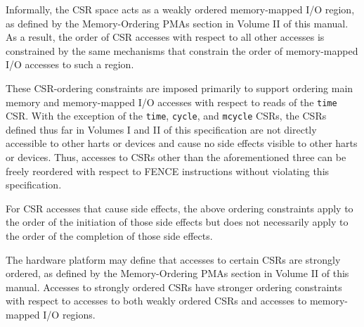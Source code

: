 \begin{commentary}
Informally, the CSR space acts as a weakly ordered memory-mapped I/O region, as
defined by the Memory-Ordering PMAs section in Volume II of this manual. As a
result, the order of CSR accesses with respect to all other accesses is
constrained by the same mechanisms that constrain the order of memory-mapped
I/O accesses to such a region.

These CSR-ordering constraints are imposed primarily to support ordering main
memory and memory-mapped I/O accesses with respect to reads of the {\tt time}
CSR.  With the exception of the {\tt time}, {\tt cycle}, and {\tt mcycle} CSRs,
the CSRs defined thus far in Volumes I and II of this specification are not
directly accessible to other harts or devices and cause no side effects visible
to other harts or devices.  Thus, accesses to CSRs other than the
aforementioned three can be freely reordered with respect to FENCE instructions
without violating this specification.
\end{commentary}

For CSR accesses that cause side effects, the above ordering constraints apply
to the order of the initiation of those side effects but does not necessarily
apply to the order of the completion of those side effects.

The hardware platform may define that accesses to certain CSRs are
strongly ordered, as defined by the Memory-Ordering PMAs section in Volume II
of this manual. Accesses to strongly ordered CSRs have stronger ordering
constraints with respect to accesses to both weakly ordered CSRs and accesses
to memory-mapped I/O regions.
